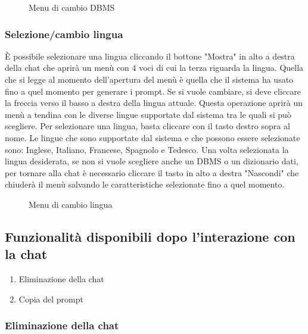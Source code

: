 \begin{figure}[H]
  \centering
  \caption{Menu di cambio DBMS}
\end{figure}

\subsubsection{Selezione/cambio lingua}

È possibile selezionare una lingua cliccando il bottone "Mostra" in alto a destra della chat che aprirà un menù con 4 voci di cui la terza riguarda la lingua. Quella che si legge al momento dell'apertura del menù è quella che il sistema ha usato fino a quel momento per generare i prompt. Se si vuole cambiare, si deve cliccare la freccia verso il basso a destra della lingua attuale. Questa operazione aprirà un menù a tendina con le diverse lingue supportate dal sistema tra le quali si può scegliere. Per selezionare una lingua, basta cliccare con il tasto destro sopra al nome. Le lingue che sono supportate dal sistema e che possono essere selezionate sono: Inglese, Italiano, Francese, Spagnolo e Tedesco. Una volta selezionata la lingua desiderata, se non si vuole scegliere anche un DBMS o un dizionario dati, per tornare alla chat è necessario cliccare il tasto in alto a destra "Nascondi" che chiuderà il menù salvando le caratteristiche selezionate fino a quel momento.

\begin{figure}[H]
  \centering
  \caption{Menu di cambio lingua}
\end{figure}

\subsection{Funzionalità disponibili dopo l'interazione con la chat}

\begin{enumerate}
  \item Eliminazione della chat
  \item Copia del prompt
\end{enumerate}

\subsubsection{Eliminazione della chat}

